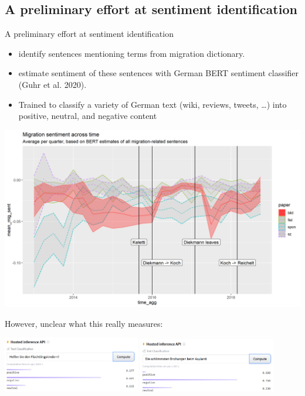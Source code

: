 \documentclass[
  ignorenonframetext,
]{beamer}
\providecommand{\tightlist}{%
  \setlength{\itemsep}{0pt}\setlength{\parskip}{0pt}}
\begin{document}
\hypertarget{a-preliminary-effort-at-sentiment-identification}{%
\subsection{A preliminary effort at sentiment
identification}\label{a-preliminary-effort-at-sentiment-identification}}

\begin{frame}[allowframebreaks]{A preliminary effort at sentiment
identification}
\begin{itemize}
\tightlist
\item
  identify sentences mentioning terms from migration dictionary.
\item
  estimate sentiment of these sentences with German BERT sentiment
  classifier (Guhr et al. 2020).
\item
  Trained to classify a variety of German text (wiki, reviews, tweets,
  \ldots) into positive, neutral, and negative content
\end{itemize}

\includegraphics{vis/comparative_sentiment_migration.png}

\framebreak

However, unclear what this really measures:

\includegraphics[width=0.45\textwidth,height=\textheight]{vis/BERTProbs2.png}
\includegraphics[width=0.45\textwidth,height=\textheight]{vis/BERTProbs3.png}


\end{frame}
\end{document}
